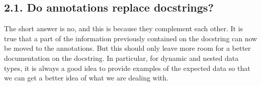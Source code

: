 \documentclass[a4paper,10pt,english]{sphinxmanual}
\begin{document}
\subsection{2.1. Do annotations replace docstrings?}
\label{\detokenize{chapters/1_docstrings_and_annotations/index:do-annotations-replace-docstrings}}
The short answer is no, and this is because they complement each other. It is true that a part of the
information previously contained on the docstring can now be moved to the annotations. But this should only
leave more room for a better documentation on the docstring. In particular, for dynamic and nested data types,
it is always a good idea to provide examples of the expected data so that we can get a better idea of what we
are dealing with.

\begin{sphinxVerbatim}[commandchars=\\\{\}]
    



     \PYG{p}{[}\PYG{p}{]}  
         

      \PYG{p}{[}\PYG{p}{]}
\end{sphinxVerbatim}
\end{document}
